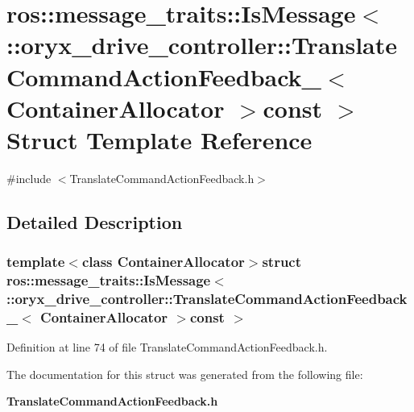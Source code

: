 \section{ros\-:\-:message\-\_\-traits\-:\-:\-Is\-Message$<$ \-:\-:oryx\-\_\-drive\-\_\-controller\-:\-:\-Translate\-Command\-Action\-Feedback\-\_\-$<$ \-Container\-Allocator $>$const $>$ \-Struct \-Template \-Reference}
\label{structros_1_1message__traits_1_1IsMessage_3_01_1_1oryx__drive__controller_1_1TranslateCommandActee0cfbd97f7311a6d5b0611b0f2cb5bb}


{\ttfamily \#include $<$\-Translate\-Command\-Action\-Feedback.\-h$>$}



\subsection{\-Detailed \-Description}
\subsubsection*{template$<$class Container\-Allocator$>$struct ros\-::message\-\_\-traits\-::\-Is\-Message$<$ \-::oryx\-\_\-drive\-\_\-controller\-::\-Translate\-Command\-Action\-Feedback\-\_\-$<$ Container\-Allocator $>$const  $>$}



\-Definition at line 74 of file \-Translate\-Command\-Action\-Feedback.\-h.



\-The documentation for this struct was generated from the following file\-:\begin{DoxyCompactItemize}
\item 
{\bf \-Translate\-Command\-Action\-Feedback.\-h}\end{DoxyCompactItemize}
